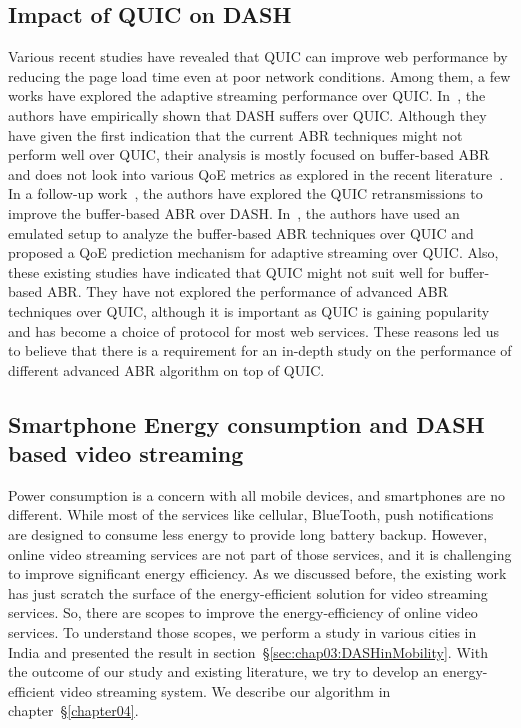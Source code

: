 \subsection{Impact of QUIC on DASH}
Various recent studies \cite{Biswal2017,Megyesi2016,bhat2017not} have revealed that QUIC can improve web performance by reducing the page load time even at poor network conditions. Among them, a few works have explored the adaptive streaming performance over QUIC. In~\cite{bhat2017not}, the authors have empirically shown that DASH suffers over QUIC. Although they have given the first indication that the current ABR techniques might not perform well over QUIC, their analysis is mostly focused on buffer-based ABR and does not look into various QoE metrics as explored in the recent literature~\cite{yin2015control,mao2017neural}. In a follow-up work~\cite{bhat2018improving}, the authors have explored the QUIC retransmissions to improve the buffer-based ABR over DASH. In~\cite{van2018empirical}, the authors have used an emulated setup to analyze the buffer-based ABR techniques over QUIC and proposed a QoE prediction mechanism for adaptive streaming over QUIC. Also, these existing studies have indicated that QUIC might not suit well for buffer-based ABR. They have not explored the performance of advanced ABR techniques over QUIC, although it is important as QUIC is gaining popularity and has become a choice of protocol for most web services. 
These reasons led us to believe that there is a requirement for an in-depth study on the performance of different advanced ABR algorithm on top of QUIC.

\subsection{Smartphone Energy consumption and DASH based video streaming}
Power consumption is a concern with all mobile devices, and smartphones are no different. While most of the services like cellular, BlueTooth, push notifications are designed to consume less energy to provide long battery backup. However, online video streaming services are not part of those services, and it is challenging to improve significant energy efficiency. As we discussed before, the existing work has just scratch the surface of the energy-efficient solution for video streaming services. So, there are scopes to improve the energy-efficiency of online video services. To understand those scopes, we perform a study in various cities in India and presented the result in section~\S\ref{sec:chap03:DASHinMobility}. With the outcome of our study and existing literature, we try to develop an energy-efficient video streaming system. We describe our algorithm in chapter~\S\ref{chapter04}.

